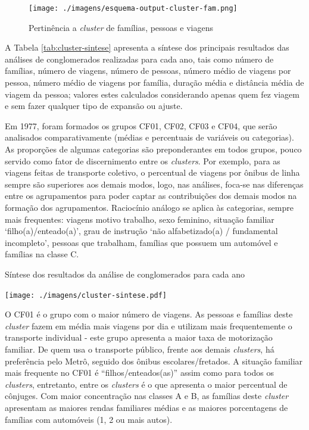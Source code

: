 \begin{figure}[htb]%
    \caption{\label{fig:output-cluster}Pertinência a \textit{cluster} de famílias, pessoas e viagens}%
    \begin{center}%
        \texttt{[image: ./imagens/esquema-output-cluster-fam.png]}%
    \end{center}%
\end{figure}%

\newpage
A Tabela \ref{tab:cluster-sintese} apresenta a síntese dos principais resultados das análises de conglomerados realizadas para cada ano, tais como número de famílias, número de viagens, número de pessoas, número médio de viagens por pessoa, número médio de viagens por família, duração média e distância média de viagem da pessoa; valores estes calculados considerando apenas quem fez viagem e sem fazer qualquer tipo de expansão ou ajuste.

Em 1977, foram formados os grupos CF01, CF02, CF03 e CF04, que serão analisados comparativamente (médias e percentuais de variáveis ou categorias).
As proporções de algumas categorias são preponderantes em todos grupos, pouco servido como fator de discernimento entre os \textit{clusters}. Por exemplo, para as viagens feitas de transporte coletivo, o percentual de viagens por ônibus de linha sempre são superiores aos demais modos, logo, nas análises, foca-se nas diferenças entre os agrupamentos para poder captar as contribuições dos demais modos na formação dos agrupamentos. Raciocínio análogo se aplica às categorias, sempre mais frequentes: viagens motivo trabalho, sexo feminino, situação familiar `filho(a)/enteado(a)', grau de instrução `não alfabetizado(a) / fundamental incompleto', pessoas que trabalham, famílias que possuem um automóvel e famílias na classe C.

\newpage
\begin{landscape}

\begin{table}[htb]%
    \caption{\label{tab:cluster-sintese}Síntese dos resultados da análise de conglomerados para cada ano}%
    \begin{center}%
        \texttt{[image: ./imagens/cluster-sintese.pdf]}%
    \end{center}%
\end{table}%

\end{landscape}

\clearpage
O CF01 é o grupo com o maior número de viagens.
As pessoas e famílias deste \textit{cluster} fazem em média mais viagens por dia e utilizam mais frequentemente o transporte individual - este grupo apresenta a maior taxa de motorização familiar.
De quem usa o transporte público, frente aos demais \textit{clusters}, há preferência pelo Metrô, seguido dos ônibus escolares/fretados.
A situação familiar mais frequente no CF01 é ``filhos/enteados(as)'' assim como para todos os \textit{clusters}, entretanto, entre os \textit{clusters} é o que apresenta o maior percentual de cônjuges.
Com maior concentração nas classes A e B, as famílias deste \textit{cluster} apresentam as maiores rendas familiares médias e as maiores porcentagens de famílias com automóveis (1, 2 ou mais autos).

